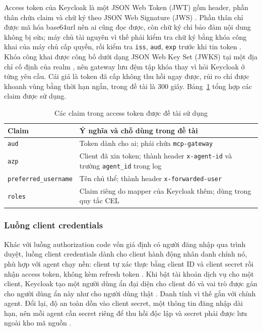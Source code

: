 Access token của Keycloak là một JSON Web Token (JWT) gồm header, phần thân chứa claim và chữ ký theo JSON Web Signature (JWS) \parencite{rfc7519,rfc7515}. Phần thân chỉ được mã hóa base64url nên ai cũng đọc được, còn chữ ký chỉ bảo đảm nội dung không bị sửa; máy chủ tài nguyên vì thế phải kiểm tra chữ ký bằng khóa công khai của máy chủ cấp quyền, rồi kiểm tra \texttt{iss}, \texttt{aud}, \texttt{exp} trước khi tin token \parencite{rfc9068}. Khóa công khai được công bố dưới dạng JSON Web Key Set (JWKS) tại một địa chỉ cố định của realm \parencite{rfc7517}, nên gateway lưu đệm tập khóa thay vì hỏi Keycloak ở từng yêu cầu. Cái giá là token đã cấp không thu hồi ngay được, rủi ro chỉ được khoanh vùng bằng thời hạn ngắn, trong đề tài là 300 giây. Bảng~\ref{tab:ch3-claims} tổng hợp các claim được sử dụng.

\begin{table}[H]\centering\caption{Các claim trong access token được đề tài sử dụng}\label{tab:ch3-claims}
{\singlespacing\renewcommand{\arraystretch}{1.2}\small
\begin{tabularx}{\textwidth}{|p{3.3cm}|X|}\hline
\textbf{Claim} & \textbf{Ý nghĩa và chỗ dùng trong đề tài} \\ \hline
\texttt{aud} & Token dành cho ai; phải chứa \texttt{mcp-gateway} \\ \hline
\texttt{azp} & Client đã xin token; thành header \texttt{x-agent-id} và trường \texttt{agent\_id} trong log \\ \hline
\texttt{preferred\_\allowbreak username} & Tên chủ thể; thành header \texttt{x-forwarded-user} \\ \hline
\texttt{roles} & Claim riêng do mapper của Keycloak thêm; dùng trong quy tắc CEL \\ \hline
\end{tabularx}}\end{table}

\subsubsection{Luồng client credentials}

Khác với luồng authorization code vốn giả định có người đăng nhập qua trình duyệt, luồng client credentials dành cho client hành động nhân danh chính nó, phù hợp với agent chạy nền: client tự xác thực bằng client ID và client secret rồi nhận access token, không kèm refresh token \parencite{rfc6749}. Khi bật tài khoản dịch vụ cho một client, Keycloak tạo một người dùng ẩn đại diện cho client đó và vai trò được gán cho người dùng ẩn này như cho người dùng thật \parencite{keycloak}. Danh tính vì thế gắn với chính agent. Đổi lại, độ an toàn dồn vào client secret, một thông tin đăng nhập dài hạn, nên mỗi agent cần secret riêng để thu hồi độc lập và secret phải được lưu ngoài kho mã nguồn \parencite{k8s_secret}.


